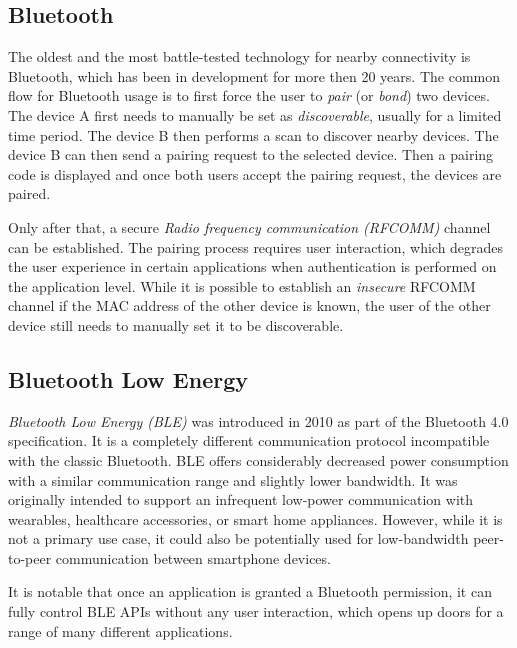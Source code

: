
\subsection{Bluetooth}

The oldest and the most battle-tested technology for nearby connectivity is Bluetooth, which has been in development for more then 20 years. The common flow for Bluetooth usage is to first force the user to \textit{pair} (or \textit{bond}) two devices. The device A first needs to manually be set as \textit{discoverable}, usually for a limited time period. The device B then performs a scan to discover nearby devices. The device B can then send a pairing request to the selected device. Then a pairing code is displayed and once both users accept the pairing request, the devices are paired.

Only after that, a secure \textit{Radio frequency communication (RFCOMM)} channel can be established. The pairing process requires user interaction, which degrades the user experience in certain applications when authentication is performed on the application level. While it is possible to establish an \textit{insecure} RFCOMM channel if the MAC address of the other device is known, the user of the other device still needs to manually set it to be discoverable.

\subsection{Bluetooth Low Energy}


\textit{Bluetooth Low Energy (BLE)} \cite{blebook} was introduced in 2010 as part of the Bluetooth 4.0 specification. It is a completely different communication protocol incompatible with the classic Bluetooth. BLE offers considerably decreased power consumption with a similar communication range and slightly lower bandwidth. It was originally intended to support an infrequent low-power communication with wearables, healthcare accessories, or smart home appliances. However, while it is not a primary use case, it could also be potentially used for low-bandwidth peer-to-peer communication between smartphone devices.

It is notable that once an application is granted a Bluetooth permission, it can fully control BLE APIs without any user interaction, which opens up doors for a range of many different applications.


